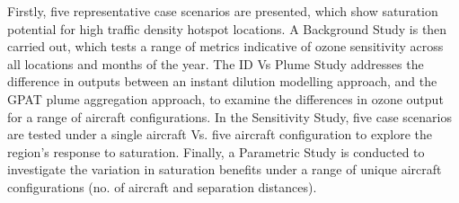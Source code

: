 Firstly, five representative case scenarios are presented, which show  saturation potential for high traffic density hotspot locations. A Background Study is then carried out, which tests a range of metrics indicative of ozone sensitivity across all locations and months of the year. The ID Vs Plume Study addresses the difference in outputs between an instant dilution modelling approach, and the GPAT plume aggregation approach, to examine the differences in ozone output for a range of aircraft configurations. In the Sensitivity Study, five case scenarios are tested under a single aircraft Vs. five aircraft configuration to explore the region's response to  saturation. Finally, a Parametric Study is conducted to investigate the variation in saturation benefits under a range of unique aircraft configurations (no. of aircraft and separation distances).